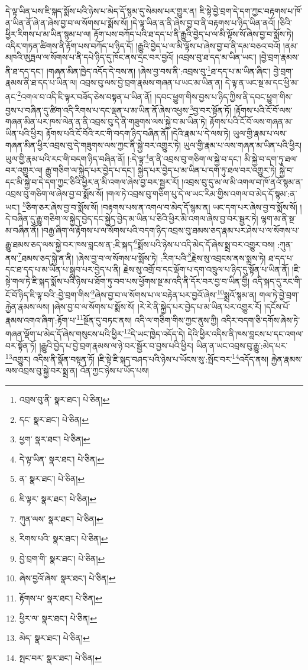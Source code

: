 དེ་ལྟ་ཡིན་པས་ཇི་སྐད་སྨོས་པའི་ཉེས་པ་མེད་དོ་སྙམ་དུ་སེམས་པར་གྱུར་ན། ཇི་སྟེ་བྱེ་བྲག་དེ་དག་ཀྱང་བརྟགས་པ་ཁོ་ན་ཡིན་ནོ་ཞེ་ན་ཞེས་བྱ་བ་ལ་སོགས་པ་སྨོས་སོ། །དེ་ལྟ་ཡིན་ན་ནི་ཞེས་བྱ་བ་ནི་བརྟགས་པ་ཉིད་ཡིན་ནའོ། །ཅིའི་ཕྱིར་རིགས་པ་མ་ཡིན་སྙམ་པ་ལ། རྟོག་པས་བཀོད་པའི་ཐ་དད་པ་ནི་རྒྱུའི་བྱེད་པ་ལ་མི་ལྟོས་སོ་ཞེས་བྱ་བ་སྨོས་ཏེ། འདིར་གཏན་ཚིགས་ནི་རྟོག་པས་བཀོད་པ་ཉིད་དོ། །རྒྱུའི་བྱེད་པ་ལ་མི་ལྟོས་པ་ཞེས་བྱ་བ་ནི་དམ་བཅའ་བའོ། །ནམ་མཁའི་ཨུཏྤལ་ལ་སོགས་པ་ནི་དཔེ་ཉིད་དུ་ཁོང་ནས་དྲང་བར་བྱའོ། །འབྲས་བུ་ཐ་དད་མ་ཡིན་ཡང་། །བྱེ་བྲག་རྣམས་ནི་ཐ་དད་དང་། །གཞན་མིན་ཁྱེད་འདོད་དེ་བས་ན། །ཞེས་བྱ་བས་ནི་:འབྲས་བུ་\footnote{འབྲས་བུ་ནི་  སྣར་ཐང་།  པེ་ཅིན། }ཐ་དད་པ་མ་ཡིན་ཞིང་། བྱེ་བྲག་རྣམས་ནི་ཐ་དད་པ་ཡིན་ལ། འབྲས་བུ་ལས་བྱེ་བྲག་རྣམས་གཞན་པ་ཡང་མ་ཡིན་ན། དེ་ལྟ་ན་ཡང་སྔ་མ་དང་ཕྱི་མ་ནང་\footnote{དང་  སྣར་ཐང་།  པེ་ཅིན། }འགལ་བ་འདི་ཇི་ལྟར་བཟོད་ཅེས་བསྟན་པ་ཡིན་ནོ། །དབང་ཕྱུག་གིས་བྱས་པ་ཉིད་ཀྱིས་ནི་དབང་ཕྱུག་གིས་བྱས་པ་བཞིན་དུ་ཚིག་འདི་རིགས་པ་དང་ལྡན་པ་མ་ཡིན་ནོ་ཞེས་འཕྱས་\footnote{ཕྱག་  སྣར་ཐང་།  པེ་ཅིན། }བྱ་བར་སྟོན་ཏོ། །རྟོགས་པའི་ངོ་བོ་ལས་གཞན་མིན་པར་ཁས་ལེན་ན་ནི་འབྲས་བུ་དེ་ནི་གཟུགས་ལས་སྐྱེ་བ་མ་ཡིན་ཏེ། རྟོགས་པའི་ངོ་བོ་ལས་གཞན་མ་ཡིན་པའི་ཕྱིར། རྟོགས་པའི་ངོ་བོའི་རང་གི་བདག་ཉིད་བཞིན་ནོ། །དེའི་རྣམ་པ་དེ་ལས་ཏེ། ཡུལ་གྱི་རྣམ་པ་ལས་གཞན་མིན་ཕྱིར་འབྲས་བུ་དེ་གཟུགས་ལས་ཀྱང་ནི་སྐྱེ་བར་འགྱུར་ཏེ། ཡུལ་གྱི་རྣམ་པ་ལས་གཞན་མ་ཡིན་པའི་ཕྱིར། ཡུལ་གྱི་རྣམ་པའི་རང་གི་བདག་ཉིད་བཞིན་ནོ། །:དེ་ལྟ་\footnote{དེ་ལྟ་ཡིན་  སྣར་ཐང་།  པེ་ཅིན། }ན་ནི་འབྲས་བུ་གཅིག་ལ་སྐྱེ་བ་དང་། མི་སྐྱེ་བ་དག་ཏུ་ཐལ་བར་འགྱུར་ལ། རྒྱུ་གཅིག་ལ་སྐྱེད་པར་བྱེད་པ་དང་། སྐྱེད་པར་བྱེད་པ་མ་ཡིན་པ་དག་ཏུ་ཐལ་བར་འགྱུར་ཏེ། སྐྱེ་བ་དང་མི་སྐྱེ་བ་དེ་དག་ཀྱང་ཅིའི་ཕྱིར་ན་མི་འགལ་ཞེས་བྱ་བར་སྦྱར་རོ། །འབྲས་བུ་དུ་མ་ལ་མི་འགལ་བ་ཁོ་ནའོ་སྙམ་ན་འབྲས་བུ་གཅིག་ལ་ཞེས་བྱ་བ་སྨོས་སོ། །གལ་ཏེ་འབྲས་བུ་གཅིག་པུ་དེ་ལ་ཡང་རིམ་གྱིས་འགལ་བ་མེད་དོ་སྙམ་:ན་ཡང་། \footnote{ན་  སྣར་ཐང་།  པེ་ཅིན། }ཅིག་ཅར་ཞེས་བྱ་བ་སྨོས་སོ། །བརྟགས་པས་ན་འགལ་བ་མེད་དོ་སྙམ་ན། ཡང་དག་པར་ཞེས་བྱ་བ་སྨོས་སོ། །དེ་བཞིན་དུ་རྒྱུ་གཅིག་ལ་སྐྱེད་བྱེད་དང་སྐྱེད་བྱེད་མ་ཡིན་པ་ཅིའི་ཕྱིར་མི་འགལ་ཞེས་བྱ་བར་སྦྱར་ཏེ། ལྷག་མ་ནི་སྔ་མ་བཞིན་ནོ། །བརྒྱ་ཞིག་ལ་རྟོགས་པ་ལ་སོགས་པའི་བདག་ཉིད་འབྲས་བུ་ཐམས་ཅད་རྣམ་པར་ཤེས་པ་ལ་སོགས་པ་རྒྱུ་ཐམས་ཅད་ལས་སྐྱེ་བར་ཁས་བླངས་ན་:ཇི་སྐད་\footnote{ཇི་ལྟར་  སྣར་ཐང་།  པེ་ཅིན། }སྨོས་པའི་ཉེས་པ་འདི་མེད་དོ་ཞེས་སྨྲ་བར་འགྱུར་བས། :ཀུན་ནས་\footnote{ཀུན་ལས་  སྣར་ཐང་།  པེ་ཅིན། }ཐམས་ཅད་སྐྱེ་ན་ནི། །ཞེས་བྱ་བ་ལ་སོགས་པ་སྨོས་ཏེ། :རིག་པའི་\footnote{རིགས་པའི་  སྣར་ཐང་།  པེ་ཅིན། }རྗེས་སུ་འབྲངས་ནས་སྨྲས་ཏེ། ཐ་དད་པ་དང་ཐ་དད་པ་མ་ཡིན་པ་སྒྲུབ་པར་བྱེད་པ་ནི། རྗེས་སུ་འགྲོ་བ་དང་ལྡོག་པ་དག་འཁྲུལ་པ་ཉིད་དུ་སྟོན་པ་ཡིན་ནོ། །ཇི་སྟེ་གལ་ཏེ་ཇི་སྐད་སྨོས་པའི་ཉེས་པ་ཐོག་ཏུ་བབ་པས་ཕྱོགས་སྔ་མ་འདི་ནི་དོར་བར་བྱ་བ་ཡིན་གྱི། འདི་སྐད་དུ་རང་གི་ངོ་བོ་ཉིད་ཇི་ལྟ་བའི་:བྱེ་བྲག་གིས་\footnote{བྱེ་བྲག་གི་  སྣར་ཐང་།  པེ་ཅིན། }ཞེས་བྱ་བ་ལ་སོགས་པ་ལ་བརྟེན་པར་བྱའོ་ཞེས་\footnote{ཞེས་བྱའོ་ཞེས་  སྣར་ཐང་།  པེ་ཅིན། }སྨྲའོ་སྙམ་ན། གལ་ཏེ་བྱེ་བྲག་རྐྱེན་རྣམས་ལས། །ཞེས་བྱ་བ་ལ་སོགས་པ་སྨོས་སོ། །རེ་རེ་ནི་སྐྱེད་པར་བྱེད་པ་མ་ཡིན་པར་འགྱུར་རོ། །དངོས་པོ་རྣམས་འགའ་ཞིག་:རྟོག་པ་\footnote{རྟོགས་པ་  སྣར་ཐང་།  པེ་ཅིན། }སྔོན་དུ་བཏང་ནས། འདི་ལ་གཅིག་གིས་ཀྱང་ནུས་ཀྱི། འདིར་བདག་ཅི་དགོས་ཞེས་ཏེ་གཞན་ལྡོག་པ་མེད་དོ་ཞེས་གསུངས་པའི་ཕྱིར་\footnote{ཕྱིར་ལ་  སྣར་ཐང་།  པེ་ཅིན། }དེ་ཡང་ཁྱེད་འདོད་དེ། དེའི་ཕྱིར་འདིས་ནི་ཁས་བླངས་པ་དང་འགལ་བར་སྟོན་ཏོ། །རྒྱུའི་བྱེད་པ་བྱེ་བྲག་རྣམས་ལ་ཉེ་བར་སྦྱོར་བ་བྱས་པའི་ཕྱིར། ཡིན་ན་ཡང་འབྲས་བུ་རྒྱུ་:མེད་པར་\footnote{མེད་  སྣར་ཐང་།  པེ་ཅིན། }འགྱུར། འདིས་ནི་སྣོན་བསྟན་ཏོ། །ཇི་སྟེ་ཇི་སྐད་བཤད་པའི་ཉེས་པ་ཡོངས་སུ་:སྤོང་བར་\footnote{སྤང་བར་  སྣར་ཐང་།  པེ་ཅིན། }འདོད་ནས། རྐྱེན་རྣམས་ལས་འབྲས་བུ་སྐྱེ་བར་སྨྲ་ན། འོན་ཀྱང་ཉེས་པ་ཡོད་པས། 